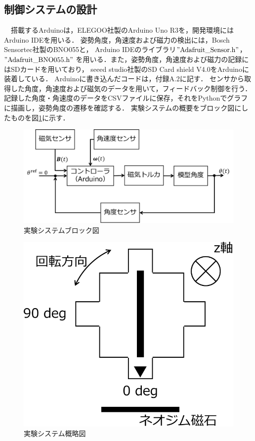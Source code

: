 \subsection{制御システムの設計}

　搭載するArduinoは，ELEGOO社製のArduino Uno R3を，開発環境にはArduino IDEを用いる．
姿勢角度，角速度および磁力の検出には，Bosch Sensortec社製のBNO055と，
Arduino IDEのライブラリ$"\mathrm{Adafruit\_Sensor.h}"$，$"\mathrm{Adafruit\_BNO055.h}"$
を用いる．また，姿勢角度，角速度および磁力の記録にはSDカードを用いており，
seeed studio社製のSD Card shield V4.0をArduinoに装着している．
Arduinoに書き込んだコードは，付録A.2に記す．
センサから取得した角度，角速度および磁気のデータを用いて，フィードバック制御を行う．
記録した角度・角速度のデータをCSVファイルに保存，それをPythonでグラフに描画し，姿勢角度の遷移を確認する．
実験システムの概要をブロック図にしたものを図\ref{fig:systemblock}に示す．

\begin{figure}[H]
	\centering
		\includegraphics[scale=0.5]{./figure/block-crop.pdf}
		\caption{実験システムブロック図}
		\label{fig:systemblock}
\end{figure}

\begin{figure}[H]
	\centering
		\includegraphics[scale=0.5]{./figure/system-crop.pdf}
		\caption{実験システム概略図}
		\label{fig:systemfig}
\end{figure}



